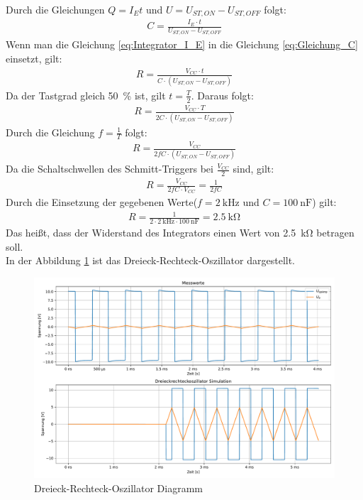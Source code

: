 Durch die Gleichungen $Q=I_E t$ und $U=U_{ST,ON}-U_{ST,OFF}$ folgt:
\begin{align}
\label{eq:Gleichung_C}
     C= \frac{I_E\cdot t}{U_{ST,ON}-U_{ST,OFF}}
\end{align}
Wenn man die Gleichung \ref{eq:Integrator_I_E} in die Gleichung \ref{eq:Gleichung_C} einsetzt, gilt:
%
\begin{align*}
     R=\frac{V_{CC}\cdot t}{C\cdot(U_{ST,ON}-U_{ST,OFF})}
\end{align*}
Da der Tastgrad gleich \SI{50}{\percent} ist, gilt $t=\frac{T}{2}$. Daraus folgt:
\begin{align*}
     R= \frac{V_{CC}\cdot T}{2C\cdot(U_{ST,ON}-U_{ST,OFF})}
\end{align*}
Durch die Gleichung $f=\frac{1}{T}$ folgt:
\begin{align*}
     R=\frac{V_{CC}}{2fC\cdot(U_{ST,ON}-U_{ST,OFF})}
\end{align*}
Da 
die Schaltschwellen des Schmitt-Triggers bei $\frac{V_{CC}}{2}$ sind, gilt:
\begin{align*}
     R= \frac{V_{CC}}{2fC\cdot V_{CC}} =\frac{1}{2fC}
\end{align*}
Durch die Einsetzung der gegebenen Werte($f=\SI{2}{\kilo\hertz}$ und $C=\SI{100}{\nano\farad}$) gilt:
\begin{align*}
     R =\frac{1}{2\cdot\SI{2}{\kilo\hertz}\cdot\SI{100}{\nano\farad}}=\SI{2,5}{\kilo\ohm}
\end{align*}
Das heißt, dass der Widerstand des Integrators einen Wert von \SI{2,5}{\kilo\ohm} betragen soll.\\
%
In der Abbildung \ref{fig:dreieckoszillator} ist das Dreieck-Rechteck-Oszillator dargestellt.
%
\begin{figure}[H]
  \centering
  \includegraphics[width=\linewidth]{Elektronik-Laborprotokoll_Filter/Plots/dreieckoszillator.pdf}
  \caption{Dreieck-Rechteck-Oszillator Diagramm}
  \label{fig:dreieckoszillator}
\end{figure}

